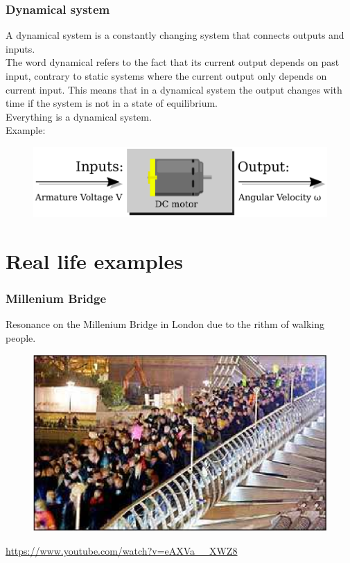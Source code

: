 \documentclass{beamer}
\begin{document}
\begin{frame}
\frametitle{Dynamical system}
A dynamical system is a constantly changing system that connects outputs and inputs.\\The word dynamical refers to the fact that its current output depends on past input, contrary to static systems where the current output only depends on current input. This means that in a dynamical system the output changes with time if the system is not in a state of equilibrium.\\
\medskip
Everything is a dynamical system.\\
Example:\\
\begin{figure}
\includegraphics[width=0.7\linewidth]{dc_motor}
\end{figure}
\end{frame}

\section{Real life examples} 

\begin{frame}
\frametitle{Millenium Bridge}
Resonance on the Millenium Bridge in London due to the rithm of walking people.
\begin{figure}
\includegraphics[scale=0.3]{millenium_bridge}
\end{figure}
\url{https://www.youtube.com/watch?v=eAXVa__XWZ8}
\end{frame}
\end{document}
